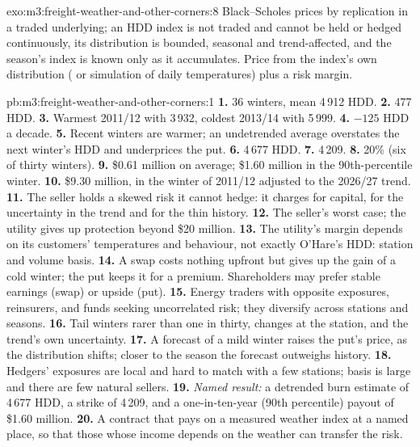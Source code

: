 \begin{solution}{exo:m3:freight-weather-and-other-corners:8}
Black--Scholes prices by replication in a traded underlying; an HDD index is not traded and cannot be held or
hedged continuously, its distribution is bounded, seasonal and trend-affected, and the season's index is
known only as it accumulates. Price from the index's own distribution ( or simulation of daily
temperatures) plus a risk margin.
\end{solution}

\begin{solution}{pb:m3:freight-weather-and-other-corners:1}
\textbf{1.} 36 winters, mean 4\,912 HDD. \textbf{2.} 477 HDD. \textbf{3.} Warmest 2011/12 with 3\,932,
coldest 2013/14 with 5\,999. \textbf{4.} $-125$ HDD a decade. \textbf{5.} Recent winters are warmer; an
undetrended average overstates the next winter's HDD and underprices the put. \textbf{6.} 4\,677 HDD.
\textbf{7.} 4\,209. \textbf{8.} 20\% (six of thirty winters). \textbf{9.} \$0.61 million on average;
\$1.60 million in the 90th-percentile winter. \textbf{10.} \$9.30 million, in the winter of 2011/12 adjusted to
the 2026/27 trend. \textbf{11.} The seller holds a skewed risk it cannot hedge: it charges for capital, for the
uncertainty in the trend and for the thin history. \textbf{12.} The seller's worst case; the utility gives up
protection beyond \$20 million. \textbf{13.} The utility's margin depends on its customers' temperatures and
behaviour, not exactly O'Hare's HDD: station and volume basis. \textbf{14.} A swap costs nothing upfront but gives
up the gain of a cold winter; the put keeps it for a premium. Shareholders may prefer stable earnings (swap) or
upside (put). \textbf{15.} Energy traders with opposite exposures, reinsurers, and funds seeking uncorrelated risk;
they diversify across stations and seasons. \textbf{16.} Tail winters rarer than one in thirty, changes at the
station, and the trend's own uncertainty. \textbf{17.} A forecast of a mild winter raises the put's price, as the
distribution shifts; closer to the season the forecast outweighs history. \textbf{18.} Hedgers' exposures are
local and hard to match with a few stations; basis is large and there are few natural sellers.
\textbf{19.} \emph{Named result:} a detrended burn estimate of 4\,677 HDD, a strike of 4\,209, and a
one-in-ten-year (90th percentile) payout of \$1.60 million. \textbf{20.} A contract that pays on a measured weather
index at a named place, so that those whose income depends on the weather can transfer the risk.
\end{solution}

